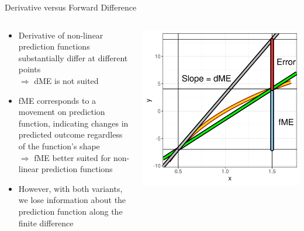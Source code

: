 \documentclass[11pt,compress,t,notes=noshow, aspectratio=169, xcolor=table]{beamer}
\begin{document}
\begin{frame}{Derivative versus Forward Difference}


\begin{columns}[T]
\begin{column}{0.6\textwidth}
\begin{itemize}
\itemsep1em
\item Derivative of non-linear prediction functions substantially differ at different points \\
$\Rightarrow$ dME is not suited
\item fME corresponds to a movement on prediction function, indicating changes in predicted outcome regardless of the function's shape\\
$\Rightarrow$ fME better suited for non-linear prediction functions
\item However, with both variants, we lose information about the prediction function along the finite difference
\end{itemize}
\end{column}
\begin{column}{0.4\textwidth}
 \includegraphics[width = \textwidth]{figure_man/derivative_me_error.png}
\end{column}
\end{columns}

\end{frame}
\end{document}
